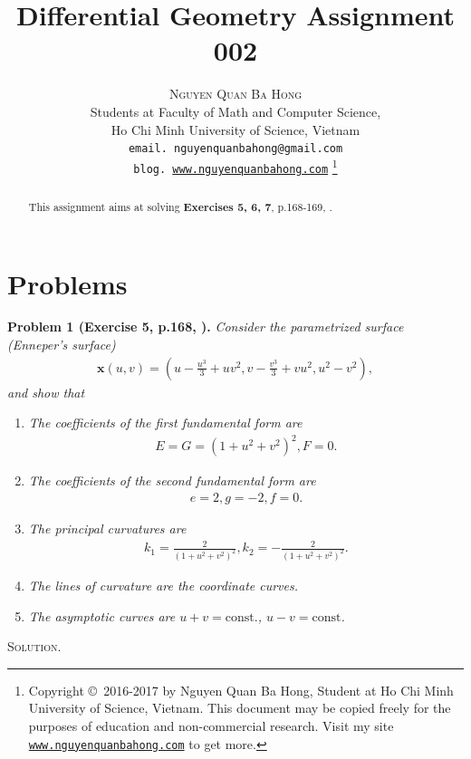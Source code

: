 \documentclass[a4paper]{article}
\title{\huge Differential Geometry Assignment 002}
\author{\textsc{Nguyen Quan Ba Hong}\\
{\small Students at Faculty of Math and Computer Science,}\\ 
{\small Ho Chi Minh University of Science, Vietnam} \\
{\small \texttt{email. nguyenquanbahong@gmail.com}}\\
{\small \texttt{blog. \url{www.nguyenquanbahong.com}} 
\footnote{Copyright \copyright\ 2016-2017 by Nguyen Quan Ba Hong, Student at Ho Chi Minh University of Science, Vietnam. This document may be copied freely for the purposes of education and non-commercial research. Visit my site \texttt{\url{www.nguyenquanbahong.com}} to get more.}}}
\numberwithin{equation}{section}
\begin{document}
\maketitle
\begin{abstract}
This assignment aims at solving \textbf{Exercises 5, 6, 7}, p.168-169, \cite{1}.
\end{abstract}
\newpage
\tableofcontents
\newpage
\listoffigures
\newpage
\section{Problems}
\textbf{Problem 1 (Exercise 5, p.168, \cite{1}).} \textit{Consider the parametrized surface (Enneper's surface)}
\begin{align}
\mathbf{x} \left( {u,v} \right) = \left( {u - \frac{{{u^3}}}{3} + u{v^2},v - \frac{{{v^3}}}{3} + v{u^2},{u^2} - {v^2}} \right),
\end{align}
\textit{and show that}
\begin{enumerate}
\item \textit{The coefficients of the first fundamental form are}
\begin{align}
\label{1.2}
E = G = {\left( {1 + {u^2} + {v^2}} \right)^2},F = 0.
\end{align}
\item \textit{The coefficients of the second fundamental form are}
\begin{align}
\label{1.3}
e = 2,g =  - 2,f = 0.
\end{align}
\item \textit{The principal curvatures are}
\begin{align}
\label{1.4}
{k_1} = \frac{2}{{{{\left( {1 + {u^2} + {v^2}} \right)}^2}}},{k_2} =  - \frac{2}{{{{\left( {1 + {u^2} + {v^2}} \right)}^2}}}.
\end{align}
\item \textit{The lines of curvature are the coordinate curves.}
\item \textit{The asymptotic curves are $u+v =\mbox{const.}$, $u-v=\mbox{const}$.}
\end{enumerate}
\textsc{Solution.} 
\end{document}
